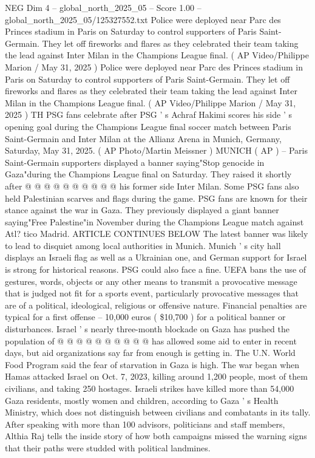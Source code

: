 \begin{textsample}{NEG Dim 4 – global\_north\_2025\_05 – Score 1.00 – global\_north\_2025\_05/125327552.txt}  \label{ex:f4_neg_243}
Police were deployed near Parc des Princes stadium in Paris on Saturday to control supporters of Paris Saint-Germain.
They let off fireworks and flares as they celebrated their team taking the lead against Inter Milan in the Champions League final. ( AP Video/Philippe Marion / May 31, 2025 ) Police were deployed near Parc des Princes stadium in Paris on Saturday to control supporters of Paris Saint-Germain.
They let off fireworks and flares as they celebrated their team taking the lead against Inter Milan in the Champions League final. ( AP Video/Philippe Marion / May 31, 2025 ) TH PSG fans celebrate after PSG ' s Achraf Hakimi scores his side ' s opening goal during the Champions League final soccer match between Paris Saint-Germain and Inter Milan at the Allianz Arena in Munich, Germany, Saturday, May 31, 2025. ( AP Photo/Martin Meissner ) MUNICH ( AP ) -- Paris Saint-Germain supporters displayed a banner saying"Stop genocide in Gaza"during the Champions League final on Saturday.
They raised it shortly after @ @ @ @ @ @ @ @ @ @ his former side Inter Milan.
Some PSG fans also held Palestinian scarves and flags during the game.
PSG fans are known for their stance against the war in Gaza.
They previously displayed a giant banner saying"Free Palestine"in November during the Champions League match against Atl? tico Madrid.
ARTICLE CONTINUES BELOW The latest banner was likely to lead to disquiet among local authorities in Munich.
Munich ' s city hall displays an Israeli flag as well as a Ukrainian one, and German support for Israel is strong for historical reasons.
PSG could also face a fine.
UEFA bans the use of gestures, words, objects or any other means to transmit a provocative message that is judged not fit for a sports event, particularly provocative messages that are of a political, ideological, religious or offensive nature.
Financial penalties are typical for a first offense -- 10,000 euros ( \$10,700 ) for a political banner or disturbances.
Israel ' s nearly three-month blockade on Gaza has pushed the population of @ @ @ @ @ @ @ @ @ @ has allowed some aid to enter in recent days, but aid organizations say far from enough is getting in.
The U.N.
World Food Program said the fear of starvation in Gaza is high.
The war began when Hamas attacked Israel on Oct. 7, 2023, killing around 1,200 people, most of them civilians, and taking 250 hostages.
Israeli strikes have killed more than 54,000 Gaza residents, mostly women and children, according to Gaza ' s Health Ministry, which does not distinguish between civilians and combatants in its tally.
After speaking with more than 100 advisors, politicians and staff members, Althia Raj tells the inside story of how both campaigns missed the warning signs that their paths were studded with political landmines.

\end{textsample}
